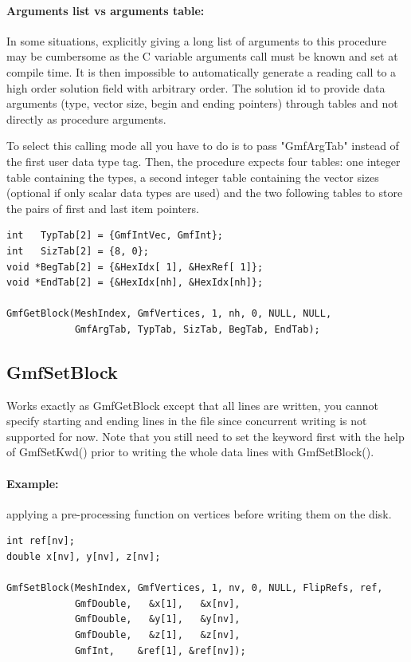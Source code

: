 \documentclass[a4paper,12pt]{article}
\begin{document}
\paragraph{Arguments list vs arguments table:} In some situations, explicitly giving a long list of arguments to this procedure may be cumbersome as the C variable arguments call must be known and set at compile time. It is then impossible to automatically generate a reading call to a high order solution field with arbitrary order.
The solution id to provide data arguments (type, vector size, begin and ending pointers) through tables and not directly as procedure arguments.

To select this calling mode all you have to do is to pass "GmfArgTab" instead of the first user data type tag.
Then, the procedure expects four tables: one integer table containing the types, a second integer table containing the vector sizes (optional if only scalar data types are used) and the two following tables to store the pairs of first and last item pointers.

\begin{tt}
\begin{verbatim}
int   TypTab[2] = {GmfIntVec, GmfInt};
int   SizTab[2] = {8, 0};
void *BegTab[2] = {&HexIdx[ 1], &HexRef[ 1]};
void *EndTab[2] = {&HexIdx[nh], &HexIdx[nh]};

GmfGetBlock(MeshIndex, GmfVertices, 1, nh, 0, NULL, NULL,
            GmfArgTab, TypTab, SizTab, BegTab, EndTab);
\end{verbatim}
\end{tt}
\normalfont


\subsection{GmfSetBlock}
Works exactly as GmfGetBlock except that all lines are written, you cannot specify starting and ending lines in the file since concurrent writing is not supported for now. Note that you still need to set the keyword first with the help of GmfSetKwd() prior to writing the whole data lines with GmfSetBlock().

\paragraph{Example:} applying a pre-processing function on vertices before writing them on the disk.

\begin{tt}
\begin{verbatim}
int ref[nv];
double x[nv], y[nv], z[nv];

GmfSetBlock(MeshIndex, GmfVertices, 1, nv, 0, NULL, FlipRefs, ref,
            GmfDouble,   &x[1],   &x[nv],
            GmfDouble,   &y[1],   &y[nv],
            GmfDouble,   &z[1],   &z[nv],
            GmfInt,    &ref[1], &ref[nv]);
\end{verbatim}
\end{tt}
\normalfont
\end{document}

